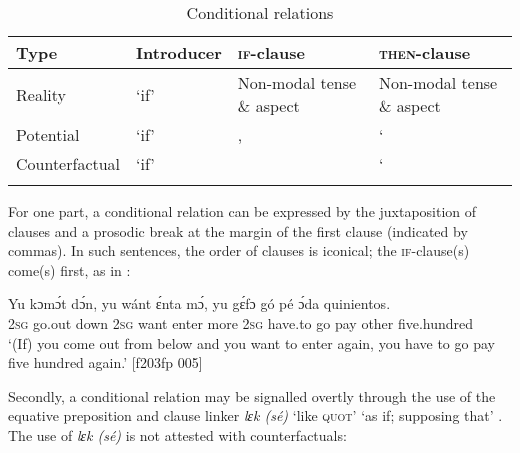 \begin{table}
\caption{Conditional relations}
\label{tab:key:10.5}

\begin{tabularx}{\textwidth}{llQQ}
\lsptoprule

Type & Introducer & \textsc{if-}clause & \textsc{then-}clause\\
\midrule
Reality &  ‘if’ & Non-modal tense \& aspect & Non-modal tense \& aspect\\
Potential &  ‘if’ &  ,\newline  {}    &  ‘ \\
Counterfactual &  ‘if’ &   &  ‘\\
\lspbottomrule
\end{tabularx}
\end{table}
For one part, a conditional relation can be expressed by the juxtaposition of clauses and a prosodic break at the margin of the first clause (indicated by commas). In such sentences, the order of clauses is iconical; the \textsc{if-}clause(s) come(s) first, as in :


\ea%
    \label{ex:key:1520}
    \gll Yu  kɔmɔ́t  dɔ́n,    yu  wánt  ɛ́nta    mɔ́,    yu  gɛ́fɔ    gó  pé
ɔ́da    quinientos.\\
\textsc{2sg}  go.out  down  \textsc{2sg}  want  enter  more  \textsc{2sg}  have.to  go  pay
other  five.hundred\\

\glt ‘(If) you come out from below and you want to enter again, you have to 
go pay five hundred again.’ [f203fp 005]
\z

Secondly, a conditional relation may be signalled overtly through the use of the equative preposition and clause linker \textit{lɛk (sé)} ‘like \textsc{quot}’ ‘as if; supposing that’ . The use of \textit{lɛk (sé)} is not attested with counterfactuals:



